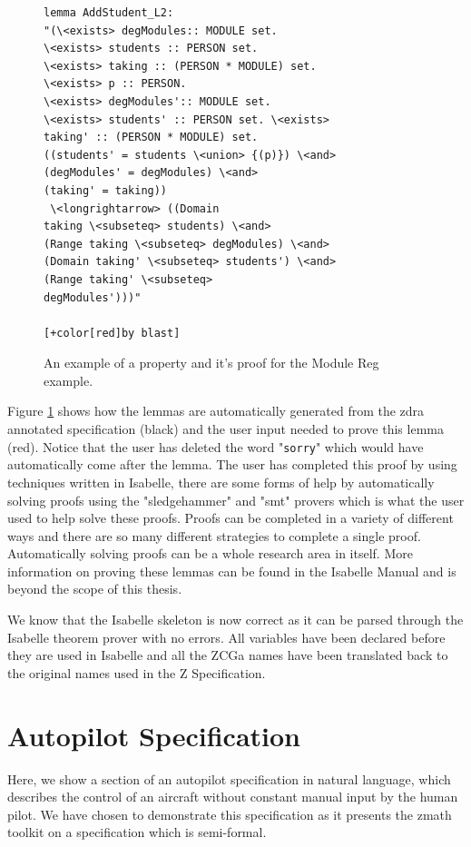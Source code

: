 \begin{figure}[H]
\begin{minipage}{0.45\textwidth}
\begin{scriptsize}
\begin{BVerbatim}[commandchars=+\[\]]
lemma AddStudent_L2: 
"(\<exists> degModules:: MODULE set. 
\<exists> students :: PERSON set. 
\<exists> taking :: (PERSON * MODULE) set. 
\<exists> p :: PERSON.
\<exists> degModules':: MODULE set. 
\<exists> students' :: PERSON set. \<exists>
taking' :: (PERSON * MODULE) set. 
((students' = students \<union> {(p)}) \<and>
(degModules' = degModules) \<and> 
(taking' = taking))
 \<longrightarrow> ((Domain
taking \<subseteq> students) \<and> 
(Range taking \<subseteq> degModules) \<and>
(Domain taking' \<subseteq> students') \<and> 
(Range taking' \<subseteq>
degModules')))"

[+color[red]by blast]
\end{BVerbatim}
\end{scriptsize}
\end{minipage}
\caption{An example of a property and it's proof for the Module Reg example. \label{fig:propertyproof}}
\end{figure}

Figure \ref{fig:propertyproof} shows how the lemmas are automatically generated from
the \gls{zdra} annotated specification (black) and the user input needed to
prove this lemma (red). Notice that the user has deleted the word
"\texttt{sorry}" which would have automatically come after the lemma.
The user has completed this proof by using techniques written in Isabelle, there are some forms of 
help by automatically solving proofs using the "sledgehammer" and "smt" provers which is what the 
user used to help solve these proofs.
Proofs can be completed in a variety of different ways and there are so many different strategies 
to complete a single proof. Automatically solving proofs can be a whole research area in itself.
More information on proving these lemmas can be found in the Isabelle Manual
\cite{isabelle} and is beyond the scope of this thesis.

We know that the Isabelle skeleton is now correct as it can be parsed through the 
Isabelle theorem prover with no errors.
All variables have been declared before they are used in Isabelle and all the ZCGa names
have been translated back to the original names used in the Z Specification.

\section{Autopilot Specification}
Here, we show a section of an autopilot specification \cite{Butler96} in natural
language, which describes
the control of an aircraft without constant manual input by the human pilot.
We have chosen to demonstrate this specification as it presents the \gls{zmath}
toolkit on a specification which is semi-formal.

